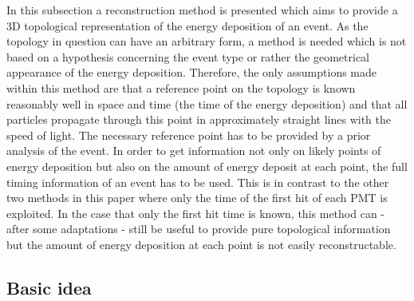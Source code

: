 In this subsection a reconstruction method is presented which aims to provide a 3D topological representation of the energy 
deposition of an event.
As the topology in question can have an arbitrary form, a method is needed which is not based on a hypothesis concerning the event
type or rather the geometrical appearance of the energy deposition. Therefore, the only assumptions made within this method are 
that a reference point on the topology is known reasonably well in space and time (the time of the energy deposition) and that 
all particles propagate through this point in approximately straight lines with the speed of light. The necessary reference point 
has to be provided by a prior analysis of the event. In order to get information not only on likely points of energy deposition 
but also on the amount of energy deposit at each point, the full timing information of an event has to be used. This is in contrast
to the other two methods in this paper where only the time of the first hit of each PMT is exploited. In the case that only the 
first hit time is known, this method can - after some adaptations - still be useful to provide pure topological information but 
the amount of energy deposition at each point is not easily reconstructable.






\subsection*{Basic idea}
\label{Sec:BasicWonsakReco}

